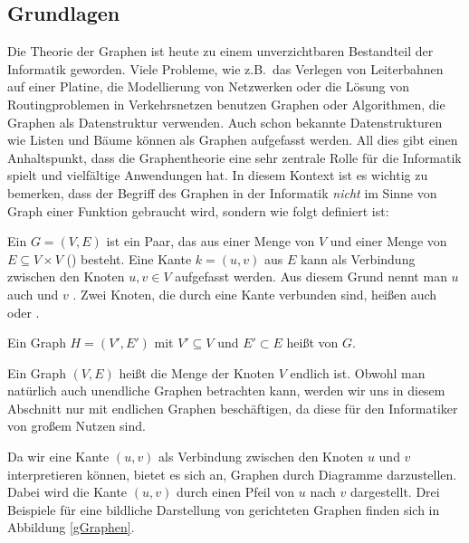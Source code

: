 \subsection{Grundlagen}
Die Theorie der Graphen ist heute zu einem unverzichtbaren Bestandteil
der Informatik geworden. Viele Probleme, wie z.B.~das Verlegen von
Leiterbahnen auf einer Platine, die Modellierung von Netzwerken oder
die Lösung von Routingproblemen in Verkehrsnetzen benutzen Graphen
oder Algorithmen, die Graphen als Datenstruktur verwenden. Auch schon
bekannte Datenstrukturen wie Listen und Bäume können als Graphen
aufgefasst werden. All dies gibt einen Anhaltspunkt, dass die
Graphentheorie eine sehr zentrale Rolle für die Informatik spielt und
vielfältige Anwendungen hat. In diesem Kontext ist es wichtig zu
bemerken, dass der Begriff des Graphen in der Informatik \emph{nicht}
im Sinne von Graph einer Funktion gebraucht wird, sondern wie folgt
definiert ist:

\begin{definition}
Ein  $G = (V,E)$ ist
ein Paar, das aus einer Menge von  $V$ und einer Menge
von  $E \subseteq V \times V$
() besteht. Eine Kante
$k = (u,v)$ aus $E$ kann als Verbindung zwischen den Knoten $u,v \in
V$ aufgefasst werden. Aus diesem Grund nennt man $u$
auch  und
$v$ . Zwei Knoten, die durch eine
Kante verbunden sind, heißen auch 
oder .

Ein Graph $H = (V', E')$ mit $V' \subseteq V$ und $E' \subset E$ heißt
 von $G$.
\end{definition}

Ein Graph $(V,E)$ heißt  \gdw die Menge der Knoten $V$
endlich ist. Obwohl man natürlich auch unendliche Graphen betrachten
kann, werden wir uns in diesem Abschnitt nur mit endlichen Graphen
beschäftigen, da diese für den Informatiker von großem Nutzen sind.

\bigskip

Da wir eine Kante $(u,v)$ als Verbindung zwischen den Knoten $u$ und
$v$ interpretieren können, bietet es sich an, Graphen durch Diagramme
darzustellen. Dabei wird die Kante $(u,v)$ durch einen Pfeil von $u$
nach $v$ dargestellt. Drei Beispiele für eine bildliche Darstellung
von gerichteten Graphen finden sich in Abbildung \ref{gGraphen}.


